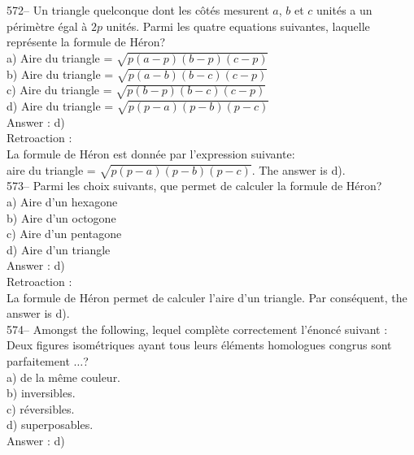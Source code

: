 ﻿\documentclass[letterpaper, 12pt]{article}
\begin{document}
572-- Un triangle quelconque dont les c\^ot\'es mesurent $a$, $b$ et $c$
unit\'es a un p\'erim\`etre \'egal \`a $2p$ unit\'es.  Parmi les quatre
equations suivantes, laquelle repr\'esente la formule de H\'eron?\\
a) Aire du triangle = $\sqrt{p\left( a-p\right) \left( b-p\right) \left(
c-p\right) }$\\[2mm]
b) Aire du triangle = $\sqrt{p\left( a-b\right) \left( b-c\right) \left(
c-p\right) }$\\[2mm]
c) Aire du triangle = $\sqrt{p\left( b-p\right) \left( b-c\right) \left(
c-p\right) }$\\[2mm]
d) Aire du triangle = $\sqrt{p\left( p-a\right) \left( p-b\right) \left(
p-c\right) }$\\

Answer : d)\\

Retroaction : \\
La formule de H\'eron est donn\'ee par l'expression suivante:\\
aire du triangle = $\sqrt{p\left( p-a\right) \left( p-b\right) \left(
p-c\right) }$.  The answer is d).\\

573-- Parmi les choix suivants, que permet de calculer la formule de
H\'eron?\\
a) Aire d'un hexagone\\
b) Aire d'un octogone\\
c) Aire d'un pentagone\\
d) Aire d'un triangle\\

Answer : d) \\

Retroaction : \\
La formule de H\'eron permet de calculer l'aire d'un triangle.  Par
cons\'equent, the answer is d).\\



574-- Amongst the following, lequel compl\`ete
correctement l'\'enonc\'e suivant : \og Deux figures isom\'etriques
ayant tous leurs \'el\'ements homologues congrus sont parfaitement $\ldots$\fg ?\\
a) de la m\^eme couleur.\\
b) inversibles.\\
c) r\'eversibles.\\
d) superposables.\\

Answer : d)\\
\end{document}
